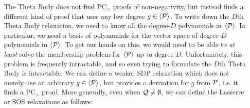 The Theta Body does not find PC$_>$ proofs of non-negativity, but instead finds a different kind of proof that uses any low degree $g \in \langle \mathcal P \rangle$. To write down the $D$th Theta Body relaxation, we need to know all the degree-$D$ polynomials in $\langle \mathcal P \rangle$. In particular, we need a basis of polynomials for the vector space of degree-$D$ polynomials in $\langle \mathcal P \rangle$. To get our hands on this, we would need to be able to \emph{at least} solve the membership problem for $\langle \mathcal P \rangle$ up to degree $D$. Unfortunately, this problem is frequently intractable, and so even trying to formulate the $D$th Theta Body is intractable. We can define a weaker SDP relaxation which does not merely use an arbitrary $g \in \langle \mathcal P \rangle$, but provides a derivation for $g$ from $\mathcal P$, i.e. it finds a PC$_>$ proof. More generally, even when $\mathcal Q \neq \emptyset$, we can define the Lasserre or SOS relaxations as follows:

